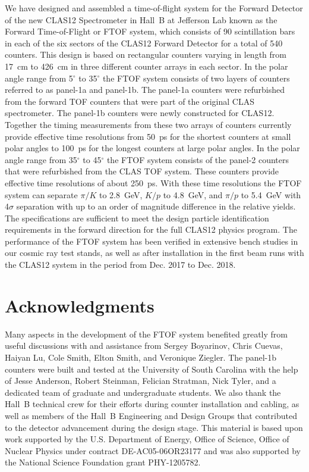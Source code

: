 \documentclass[3p,times,twocolumn]{elsarticle}
\begin{document}
We have designed and assembled a time-of-flight system for the Forward Detector of the new CLAS12
Spectrometer in Hall~B at Jefferson Lab known as the Forward Time-of-Flight or FTOF system, which
consists of 90 scintillation bars in each of the six sectors of the CLAS12 Forward Detector for a total of
540 counters. This design is based on rectangular counters varying in length from 17~cm to 426~cm in
three different counter arrays in each sector. In the polar angle range from 5$^\circ$ to 35$^\circ$ the
FTOF system consists of two layers of counters referred to as panel-1a and panel-1b. The panel-1a counters
were refurbished from the forward TOF counters that were part of the original CLAS spectrometer. The
panel-1b counters were newly constructed for CLAS12. Together the timing measurements from these
two arrays of counters currently provide effective time resolutions from 50~ps for the shortest counters at
small polar angles to 100~ps for the longest counters at large polar angles. In the polar angle range from
35$^\circ$ to 45$^\circ$ the FTOF system consists of the panel-2 counters that were refurbished from the
CLAS TOF system. These counters provide effective time resolutions of about 250~ps. With these time
resolutions the FTOF system can separate $\pi/K$ to 2.8~GeV, $K/p$ to 4.8~GeV, and $\pi/p$ to 5.4~GeV
with 4$\sigma$ separation with up to an order of magnitude difference in the relative yields. The specifications
are sufficient to meet the design particle identification requirements in the forward direction for the full
CLAS12 physics program. The performance of the FTOF system has been verified in extensive bench studies
in our cosmic ray test stands, as well as after installation in the first beam runs with the CLAS12 system in the
period from Dec. 2017 to Dec. 2018. 

\section*{Acknowledgments}

Many aspects in the development of the FTOF system benefited greatly from useful discussions with and
assistance from Sergey Boyarinov, Chris Cuevas, Haiyan Lu, Cole Smith, Elton Smith, and Veronique Ziegler. The
panel-1b counters were built and tested at the University of South Carolina with the help of Jesse Anderson,
Robert Steinman, Felician Stratman, Nick Tyler, and a dedicated team of graduate and undergraduate students.
We also thank the Hall~B technical crew for their efforts during counter installation and cabling, as well as
members of the Hall~B Engineering and Design Groups that contributed to the detector advancement during the
design stage. This material is based upon work supported by the U.S. Department of Energy, Office of Science,
Office of Nuclear Physics under contract DE-AC05-06OR23177 and was also supported by the National Science
Foundation grant PHY-1205782.
\end{document}
